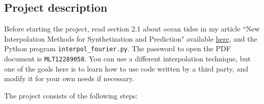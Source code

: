 \documentclass[oneside,10pt]{book}
\begin{document}
\subsection{Project description} 

Before starting the project, read section 2.1 about ocean tides in my article 
``New Interpolation Methods  for Synthetization and Prediction" available \href{https://mltblog.com/3Xhm9v9}{here}, and
 the Python program \texttt{interpol\_fourier.py}. The password to open the PDF document is \texttt{MLT12289058}. You can use a different interpolation technique, 
but one of the goals here is to learn how to use code written by a third party, and modify it for your own needs if necessary.  

\noindent The project consists of the following steps: \vspace{1ex}
\end{document}
